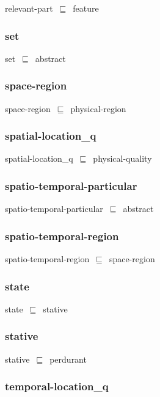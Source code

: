 \documentclass{article}
\begin{document}
relevant-part~\ensuremath{\sqsubseteq}~feature~

\subsubsection*{set}

set~\ensuremath{\sqsubseteq}~abstract~

\subsubsection*{space-region}

space-region~\ensuremath{\sqsubseteq}~physical-region~

\subsubsection*{spatial-location_q}

spatial-location\_q~\ensuremath{\sqsubseteq}~physical-quality~

\subsubsection*{spatio-temporal-particular}

spatio-temporal-particular~\ensuremath{\sqsubseteq}~abstract~

\subsubsection*{spatio-temporal-region}

spatio-temporal-region~\ensuremath{\sqsubseteq}~space-region~

\subsubsection*{state}

state~\ensuremath{\sqsubseteq}~stative~

\subsubsection*{stative}

stative~\ensuremath{\sqsubseteq}~perdurant~

\subsubsection*{temporal-location_q}
\end{document}
